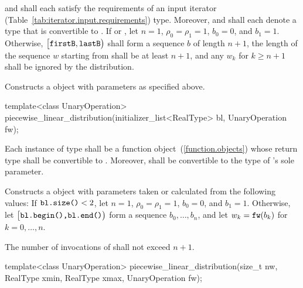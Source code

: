 \begin{itemdescr}
\pnum\requires
   and 
  shall each satisfy the requirements
  of an input iterator (Table~\ref{tab:iterator.input.requirements}) type.
  Moreover,
   and
  shall each denote a type that is convertible to .
 If 
 or ,
 let $ n = 1 $,
     $ \rho_0 = \rho_1 = 1 $,
     $ b_0 = 0 $,
 and $ b_1 = 1 $.
 Otherwise,
 $\bigl[\texttt{firstB}, \texttt{lastB}\bigr)$
 shall form a sequence $b$ of length $n+1$,
 the length of the sequence $w$ starting from 
 shall be at least $n+1$,
 and any $w_k$ for  $k \geq n+1$ shall be ignored by the distribution.

\pnum\effects Constructs a  object
 with parameters as specified above.
\end{itemdescr}


%
\begin{itemdecl}
template<class UnaryOperation>
 piecewise_linear_distribution(initializer_list<RealType> bl, UnaryOperation fw);
\end{itemdecl}

\begin{itemdescr}
\pnum\requires
 Each instance of type 
 shall be a function object~(\ref{function.objects})
 whose return type shall be convertible to .
 Moreover,
  shall be convertible
 to the type of 's sole parameter.

\pnum\effects Constructs a  object
 with parameters taken or calculated
 from the following values:
 If $\texttt{bl.size()} < 2$,
 let $n = 1$,
     $ \rho_0 = \rho_1 = 1 $,
     $ b_0 = 0 $,
 and $ b_1 = 1 $.
 Otherwise,
 let $\bigl[\texttt{bl.begin(),} \texttt{bl.end()}\bigr)$
 form a sequence $ b_0, \ldots, b_n $,
 and
 let $ w_k = \texttt{fw}(b_k) $
 for $ k = 0, \ldots, n $.

\pnum\complexity
 The number of invocations of  shall not exceed $n+1$.
\end{itemdescr}


%
\begin{itemdecl}
template<class UnaryOperation>
 piecewise_linear_distribution(size_t nw, RealType xmin, RealType xmax, UnaryOperation fw);
\end{itemdecl}

